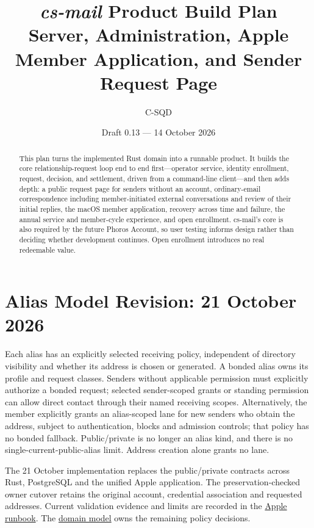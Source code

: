 \documentclass[11pt]{article}
\title{\textit{cs-mail} Product Build Plan\\
\large Server, Administration, Apple Member Application, and Sender Request Page}
\author{C-SQD}
\date{Draft 0.13 --- 14 October 2026}
\begin{document}
\maketitle

\begin{abstract}
This plan turns the implemented Rust domain into a runnable product. It builds
the core relationship-request loop end to end first---operator service, identity
enrollment, request, decision, and settlement, driven from a command-line
client---and then adds depth: a public request page for senders without an
account, ordinary-email correspondence including member-initiated external
conversations and review of their initial replies, the macOS
member application, recovery across time and failure, the
annual service and member-cycle experience, and open enrollment. cs-mail's core is
also required by the future Phoros Account, so user testing informs design rather
than deciding whether development continues. Open enrollment introduces no real
redeemable value.
\end{abstract}

\medskip\noindent{}\medskip

\section{Alias Model Revision: 21 October 2026}

Each alias has an explicitly selected receiving policy, independent of directory
visibility and whether its address is chosen or generated. A bonded alias owns its
profile and request classes. Senders without applicable permission must explicitly
authorize a bonded request; selected sender-scoped grants or standing permission
can allow direct contact through their named receiving scopes. Alternatively,
the member explicitly grants an alias-scoped lane for new senders who obtain the
address, subject to authentication, blocks and admission controls; that policy has
no bonded fallback. Public/private is no longer an alias kind, and there is no
single-current-public-alias limit. Address creation alone grants no lane.

The 21 October implementation replaces the public/private contracts across Rust,
PostgreSQL and the unified Apple application. The preservation-checked owner
cutover retains the original account, credential association and requested
addresses. Current validation evidence and limits are recorded in the
\href{apps/cs-mail-apple/README.md}{Apple runbook}. The
\href{DOMAIN_MODEL.md}{domain model} owns the remaining policy decisions.
\end{document}
